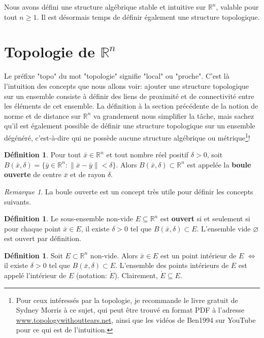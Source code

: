 \documentclass{report}
\theoremstyle{plain}
\theoremstyle{definition}
\newtheorem{defn}[thm]{Définition}
\theoremstyle{remark}
\newtheorem*{remark}{Remarque}
\newcommand*{\norm}[1]{\lVert#1\rVert}
\newcommand*{\interior}[1]{\mathring{#1}}
\begin{document}
Nous avons défini une structure algébrique stable et intuitive sur $\mathbb R^n$, valable pour tout $n \geq 1$. Il est désormais temps de définir également une structure topologique.

\section{Topologie de $\mathbb R^n$}
Le préfixe "topo" du mot "topologie" signifie "local" ou "proche". C'est là l'intuition des concepts que nous allons voir: ajouter une structure topologique sur un ensemble consiste à définir des liens de proximité et de connectivité entre les éléments de cet ensemble. La définition à la section précédente de la notion de norme et de distance sur $\mathbb R^n$ va grandement nous simplifier la tâche, mais sachez qu'il est également possible de définir une structure topologique sur un ensemble dégénéré, c'est-à-dire qui ne possède aucune structure algébrique ou métrique\footnote{Pour ceux intéressés par la topologie, je recommande le livre gratuit de Sydney Morris à ce sujet, qui peut être trouvé en format PDF à l'adresse \url{www.topologywithouttears.net}, ainsi que les vidéos de Ben1994 sur YouTube pour ce qui est de l'intuition.}! \par

\begin{defn}
	Pour tout $\bar x \in \mathbb R^n$ et tout nombre réel positif $\delta > 0$, soit $B(\bar x, \delta) = \{\bar y \in \mathbb R^n : \norm{\bar x - \bar y} < \delta\}$. Alors $B(\bar x, \delta) \subset \mathbb R^n$ est appelée la \textbf{boule ouverte} de centre $\bar x$ et de rayon $\delta$.
\end{defn}
\begin{remark}La boule ouverte est un concept très utile pour définir les concepts suivants.\end{remark}

\begin{defn}
	Le sous-ensemble non-vide $E \subseteq \mathbb R^n$ est \textbf{ouvert} si et seulement si pour chaque point $\bar x \in E$, il existe $\delta > 0$ tel que $B(\bar x, \delta) \subset E$. L'ensemble vide $\varnothing$ est ouvert par définition.
\end{defn}

\begin{defn}
	Soit $E \subset \mathbb R^n$ non-vide. Alors $\bar x \in E$ est un point intérieur de $E$ $\iff$ il existe $\delta > 0$ tel que $B(\bar x, \delta) \subset E$. L'ensemble des points intérieurs de $E$ est appelé l'intérieur de $E$ (notation: $\interior E$). Clairement, $\interior E \subseteq E$. \\
\end{defn}
\end{document}
